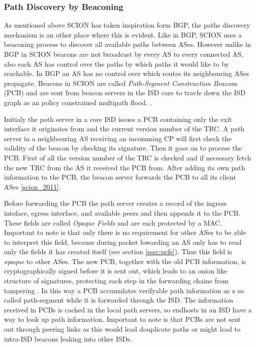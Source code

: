 \documentclass[../eva1_scion.tex]{subfiles}
\begin{document}
    \subsubsection{Path Discovery by Beaconing}\label{sssec:beaconing}
    As mentioned above SCION has taken inspiration form BGP, the paths discovery mechanism is an other place where this is evident. Like in BGP, SCION uses a beaconing process to discover all available paths between ASes. However unlike in BGP in SCION beacons are not broadcast by every AS to every connected AS, also each AS has control over the paths by which paths it would like to by reachable. In BGP an AS has no control over which routes its neighbouring ASes propagate. Beacons in SCION are called \textit{Path-Segment Construction Beacon}s (PCB) and are  sent from beacon servers in the ISD core to travle down the ISD graph as an policy constrained multipath flood. \cite{scion_2011}.

    Initialy the path server in a core ISD issues a PCB containing only the exit interface it originates from and the current version number of the TRC. A path server in a neighbouring AS receiving an incomming CP will first check the validity of the beacon by checking its signature. Then it goes on to process the PCB. First of all the version number of the TRC is checked and if necessary fetch the new TRC from the AS it received the PCB from. After adding its own path information to the PCB, the beacon server forwards the PCB to all its client ASes \ref{scion_2011}.

    Before forwarding the PCB the path server creates a record of the ingress inteface, egress interface, and available peers and then appends it to the PCB. These fields are called \textit{Opaque Fields} and are each protected by a MAC. Important to note is that only there is no requirement for other ASes to be able to interpret this field, because during packet fowarding an AS only has to read only the fields it has created itself (see section \ref{ssec:pcfs}). Thus this field is \textit{opaque} to other ASes. The new PCB, together with the old PCB information, is cryptographically signed before it is sent out, which leads to an onion like structure of signatures, protecting each step in the forwarding chaine from tampering \cite{scion_2011}. In this way a PCB accumulates verifyable path information as a so called path-segment while it is forwarded through the ISD. The information received in PCBs is cached in the local path servers, so endhosts in an ISD have a way to look up path information. Important to note is that PCBs are not sent out through peering links as this would lead douplicate paths or might lead to intra-ISD beacons leaking into other ISDs.
\end{document}
